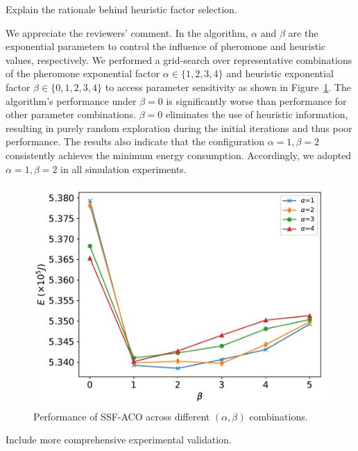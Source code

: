 \begin{metacomment}
	Explain the rationale behind heuristic factor selection.
\end{metacomment}
\begin{metaresponse}%
	We appreciate the reviewers' comment.
	In the algorithm, $\alpha$ and $\beta$ are the exponential parameters to control the influence of pheromone and heuristic values, respectively.
	We performed a grid-search over representative combinations of the pheromone exponential factor $\alpha\in\{1,2,3,4\}$ and heuristic exponential factor $\beta\in\{0,1,2,3,4\}$ to access parameter sensitivity as shown in Figure~\ref{meta:fig:cali}.
	The algorithm's performance under $\beta=0$ is significantly worse than performance for other parameter combinations. $\beta=0$ eliminates the use of heuristic information, resulting in purely random exploration during the initial iterations and thus poor performance.
	The results also indicate that the configuration $\alpha=1,\beta=2$ consistently achieves the minimum energy consumption. Accordingly, we adopted $\alpha=1,\beta=2$ in all simulation experiments.
	\begin{figure}[h]
		\centerline{\includegraphics[width=.5\textwidth]{fig/cali.pdf}}
		\caption{Performance of SSF-ACO across different $(\alpha,\beta)$ combinations.}
		\label{meta:fig:cali}
	\end{figure}
\end{metaresponse}

\begin{metacomment}
	Include more comprehensive experimental validation.
\end{metacomment}
\begin{metaresponse}%
	
\end{metaresponse}

